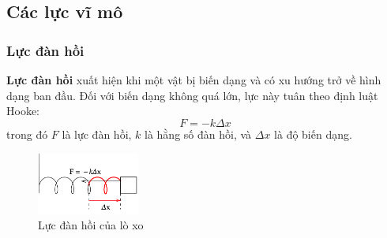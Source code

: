 \subsection{Các lực vĩ mô}
\begin{frame}
    \frametitle{Lực đàn hồi}
    \textbf{Lực đàn hồi} xuất hiện khi một vật bị biến dạng và có xu hướng trở về hình dạng ban đầu. Đối với biến dạng không quá lớn, lực này tuân theo định luật Hooke:
    \begin{equation}
        F = -k \Delta x
    \end{equation}
    trong đó \(F\) là lực đàn hồi, \(k\) là hằng số đàn hồi, và \(\Delta x\) là độ biến dạng.
    \begin{figure}
        \centering
        \includegraphics[width=0.3\textwidth]{Slides/Figure/springmass.png}
        \caption{Lực đàn hồi của lò xo}
    \end{figure}
\end{frame}

